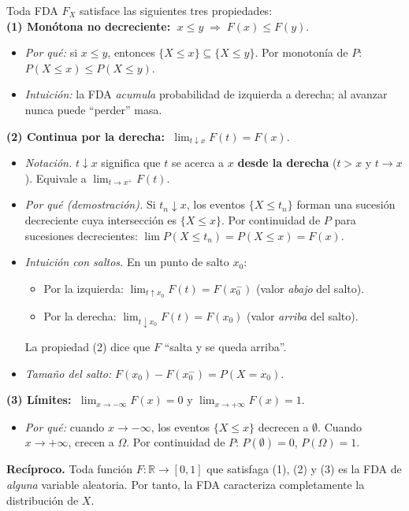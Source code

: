 \documentclass[10pt,a4paper]{article}
\numberwithin{equation}{section}
\newcommand{\R}{\mathbb{R}}
\newcounter{thmcount}[section]
\renewcommand{\thethmcount}{\thesection.\arabic{thmcount}}
\newenvironment{proposicion}[1]{%
  \refstepcounter{thmcount}%
  \begin{tcolorbox}[thmbox, title={Proposici\'on \thethmcount\ \textperiodcentered\ #1}]%
}{\end{tcolorbox}}
\begin{document}
\begin{proposicion}{Propiedades de la FDA}
  Toda FDA $F_X$ satisface las siguientes tres propiedades:
  \\[3pt]
  \textbf{(1) Mon\'otona no decreciente:} $\;x \leq y \;\Rightarrow\; F(x) \leq F(y)$.
  \begin{itemize}
    \item \emph{Por qu\'e:} si $x\leq y$, entonces $\{X\leq x\}\subseteq\{X\leq y\}$.
          Por monoton\'ia de $P$: $P(X\leq x)\leq P(X\leq y)$.
    \item \emph{Intuici\'on:} la FDA \emph{acumula} probabilidad de izquierda a derecha;
          al avanzar nunca puede ``perder'' masa.
  \end{itemize}
  \textbf{(2) Continua por la derecha:} $\;\lim_{t\downarrow x} F(t) = F(x)$.
  \begin{itemize}
    \item \emph{Notaci\'on.} $t\downarrow x$ significa que $t$ se acerca a $x$
          \textbf{desde la derecha} ($t>x$ y $t\to x$). Equivale a $\lim_{t\to x^+} F(t)$.
    \item \emph{Por qu\'e (demostraci\'on).} Si $t_n \downarrow x$, los eventos $\{X\leq t_n\}$
          forman una sucesi\'on decreciente cuya intersecci\'on es $\{X\leq x\}$.
          Por continuidad de $P$ para sucesiones decrecientes:
          $\lim P(X\leq t_n) = P(X\leq x) = F(x)$.
    \item \emph{Intuici\'on con saltos.} En un punto de salto $x_0$:
          \begin{itemize}
            \item Por la izquierda: $\lim_{t\uparrow x_0} F(t) = F(x_0^-)$ (valor \emph{abajo} del salto).
            \item Por la derecha: $\lim_{t\downarrow x_0} F(t) = F(x_0)$ (valor \emph{arriba} del salto).
          \end{itemize}
          La propiedad (2) dice que $F$ ``salta y se queda arriba''.
    \item \emph{Tama\~no del salto:} $F(x_0) - F(x_0^-) = P(X = x_0)$.
  \end{itemize}
  \textbf{(3) L\'imites:} $\;\lim_{x\to-\infty} F(x) = 0$ \;y\; $\lim_{x\to+\infty} F(x) = 1$.
  \begin{itemize}
    \item \emph{Por qu\'e:} cuando $x\to-\infty$, los eventos $\{X\leq x\}$ decrecen a $\emptyset$.
          Cuando $x\to+\infty$, crecen a $\Omega$. Por continuidad de $P$: $P(\emptyset)=0$, $P(\Omega)=1$.
  \end{itemize}
  \textbf{Rec\'iproco.} Toda funci\'on $F:\R\to[0,1]$ que satisfaga (1), (2) y (3) es la FDA
  de \emph{alguna} variable aleatoria. Por tanto, la FDA caracteriza completamente la
  distribuci\'on de $X$.
\end{proposicion}
\end{document}
